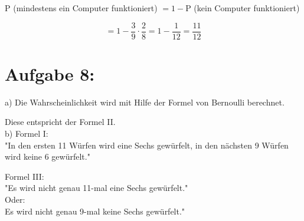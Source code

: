 \documentclass[10pt]{article}
\begin{document}
P (mindestens ein Computer funktioniert) $=1-\mathrm{P}$ (kein Computer funktioniert)

$$
=1-\frac{3}{9} \cdot \frac{2}{8}=1-\frac{1}{12}=\frac{11}{12}
$$

\section*{Aufgabe 8:}
a) Die Wahrscheinlichkeit wird mit Hilfe der Formel von Bernoulli berechnet.

Diese entspricht der Formel II.\\
b) Formel I:\\
"In den ersten 11 Würfen wird eine Sechs gewürfelt, in den nächsten 9 Würfen wird keine 6 gewürfelt."

Formel III:\\
"Es wird nicht genau 11-mal eine Sechs gewürfelt."\\
Oder:\\
Es wird nicht genau 9-mal keine Sechs gewürfelt."
\end{document}

